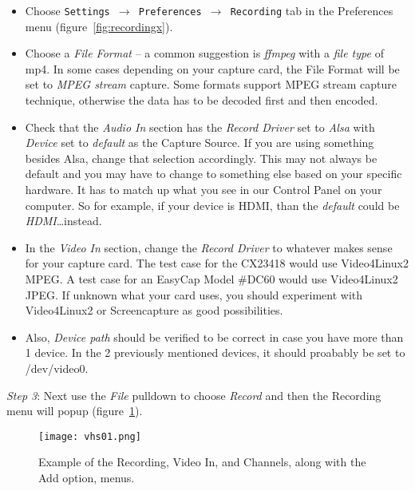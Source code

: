\begin{itemize}
    \item Choose \texttt{Settings $\rightarrow$ Preferences $\rightarrow$ Recording} tab in the Preferences menu (figure~\ref{fig:recordingx}).
    \item Choose a \textit{File Format} -- a common suggestion is \textit{ffmpeg} with a \textit{file type} of mp4.  In some cases depending on your capture card, the File Format will be set to \textit{MPEG stream} capture. Some formats support MPEG stream capture technique, otherwise the data has to be decoded first and then encoded.
    \item Check that the \textit{Audio In} section has the \textit{Record Driver} set to \textit{Alsa} with \textit{Device} set to \textit{default} as the Capture Source.  If you are using something besides Alsa, change that selection accordingly. This may not always be default and you may have to change to something else based on your specific hardware. It has to match up what you see in our Control Panel on your computer. So for example, if your device is HDMI, than the \textit{default} could be \textit{HDMI}\dots instead.
    \item In the \textit{Video In} section, change the\textit{ Record Driver} to whatever makes sense for your capture card. The test case for the CX23418 would use Video4Linux2 MPEG. A test case for an EasyCap Model \#DC60 would use Video4Linux2 JPEG.  If unknown what your card uses, you should experiment with Video4Linux2 or Screencapture as good possibilities.
    \item Also, \textit{Device path} should be verified to be correct in case you have more than 1 device. In the 2 previously mentioned devices, it should proabably be set to /dev/video0.
\end{itemize}

\textit{Step 3}: Next use the \textit{File} pulldown to choose \textit{Record} and then the Recording menu will popup (figure~\ref{fig:vhs01}).

\begin{figure}[htpb]
	\centering
	\texttt{[image: vhs01.png]}
	\caption{Example of the Recording, Video In, and Channels, along with the Add option, menus.}
	\label{fig:vhs01}
\end{figure}

